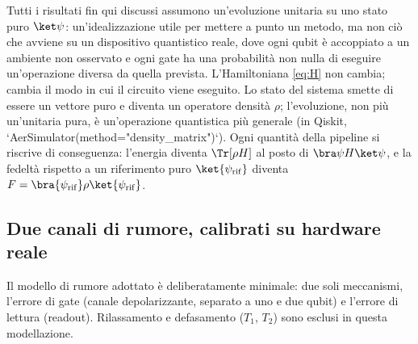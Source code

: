 \documentclass[11pt,a4paper]{article}
\begin{document}
Tutti i risultati fin qui discussi assumono un'evoluzione unitaria su uno
stato puro $\ket\psi$: un'idealizzazione utile per mettere a punto un
metodo, ma non ciò che avviene su un dispositivo quantistico reale, dove
ogni qubit è accoppiato a un ambiente non osservato e ogni gate ha una
probabilità non nulla di eseguire un'operazione diversa da quella
prevista. L'Hamiltoniana \eqref{eq:H} non cambia; cambia il modo in cui il
circuito viene eseguito. Lo stato del sistema smette di essere un vettore
puro e diventa un operatore densità $\rho$; l'evoluzione, non più
un'unitaria pura, è un'operazione quantistica più generale (in Qiskit,
`AerSimulator(method="density\_matrix")`). Ogni quantità della pipeline si
riscrive di conseguenza: l'energia diventa $\Tr[\rho H]$ al posto di
$\bra\psi H\ket\psi$, e la fedeltà rispetto a un riferimento puro
$\ket{\psi_{\rm rif}}$ diventa $F=\bra{\psi_{\rm rif}}\rho\ket{\psi_{\rm rif}}$.

\subsection{Due canali di rumore, calibrati su hardware reale}

Il modello di rumore adottato è deliberatamente minimale: due soli
meccanismi, l'errore di gate (canale depolarizzante, separato a uno e due
qubit) e l'errore di lettura (readout). Rilassamento e defasamento
($T_1$, $T_2$) sono esclusi in questa modellazione.
\end{document}
